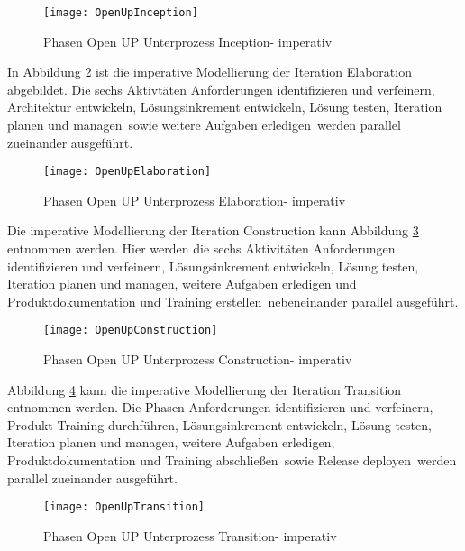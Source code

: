\begin{figure}[htp]
\begin{center}
  \texttt{[image: OpenUpInception]} %
  \caption{Phasen Open UP Unterprozess Inception- imperativ}
  \label{fig:OpenUpInception}
\end{center}
\end{figure}

In Abbildung \ref{fig:OpenUpElaboration} ist die imperative Modellierung der Iteration Elaboration abgebildet. Die sechs Aktivtäten \grqq Anforderungen identifizieren und verfeinern, Architektur entwickeln, Lösungsinkrement entwickeln, Lösung testen, Iteration planen und managen\grqq \ sowie \grqq weitere Aufgaben erledigen\grqq \ werden parallel zueinander ausgeführt.

\begin{figure}[htp]
\begin{center}
  \texttt{[image: OpenUpElaboration]} %
  \caption{Phasen Open UP Unterprozess Elaboration- imperativ}
  \label{fig:OpenUpElaboration}
\end{center}
\end{figure}

Die imperative Modellierung der Iteration Construction kann Abbildung \ref{fig:OpenUpConstruction} entnommen werden. Hier werden die sechs Aktivitäten \grqq Anforderungen identifizieren und verfeinern, Lösungsinkrement entwickeln, Lösung testen, Iteration planen und managen, weitere Aufgaben erledigen und \grqq Produktdokumentation und Training erstellen\grqq \ nebeneinander parallel ausgeführt.
\begin{figure}[htp]
\begin{center}
  \texttt{[image: OpenUpConstruction]} %
  \caption{Phasen Open UP Unterprozess Construction- imperativ}
  \label{fig:OpenUpConstruction}
\end{center}
\end{figure}

Abbildung \ref{fig:OpenUpTransition} kann die imperative Modellierung der Iteration Transition entnommen werden. Die Phasen \grqq Anforderungen identifizieren und verfeinern, Produkt Training durchführen, Lösungsinkrement entwickeln, Lösung testen, Iteration planen und managen, weitere Aufgaben erledigen, Produktdokumentation und Training abschließen\grqq \ sowie \grqq Release deployen\grqq \ werden parallel zueinander ausgeführt.

\begin{figure}[htp]
\begin{center}
  \texttt{[image: OpenUpTransition]} %
  \caption{Phasen Open UP Unterprozess Transition- imperativ}
  \label{fig:OpenUpTransition}
\end{center}
\end{figure}



